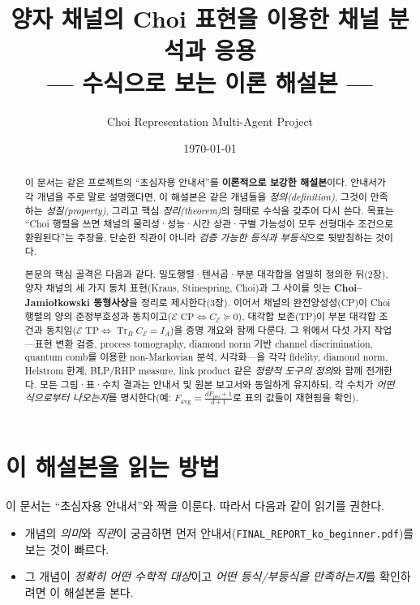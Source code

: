 \documentclass[11pt,a4paper]{article}
\title{\textbf{양자 채널의 Choi 표현을 이용한 채널 분석과 응용\\[4pt]
\large{--- 수식으로 보는 이론 해설본 ---}}}
\author{Choi Representation Multi-Agent Project}
\date{\today}
\newcommand{\E}{\mathcal{E}}
\newcommand{\Tr}{\operatorname{Tr}}
\theoremstyle{definition}
\theoremstyle{plain}
\theoremstyle{remark}
\begin{document}
\maketitle

\begin{abstract}
이 문서는 같은 프로젝트의 ``초심자용 안내서''를 \textbf{이론적으로 보강한 해설본}이다. 안내서가 각 개념을 주로 말로 설명했다면, 이 해설본은 같은 개념들을 \emph{정의(definition)}, 그것이 만족하는 \emph{성질(property)}, 그리고 핵심 \emph{정리(theorem)}의 형태로 수식을 갖추어 다시 쓴다. 목표는 ``Choi 행렬을 쓰면 채널의 물리성·성능·시간 상관·구별 가능성이 모두 선형대수 조건으로 환원된다''는 주장을, 단순한 직관이 아니라 \emph{검증 가능한 등식과 부등식}으로 뒷받침하는 것이다.

본문의 핵심 골격은 다음과 같다. 밀도행렬·텐서곱·부분 대각합을 엄밀히 정의한 뒤(2장), 양자 채널의 세 가지 동치 표현(Kraus, Stinespring, Choi)과 그 사이를 잇는 \textbf{Choi--Jamio{\l}kowski 동형사상}을 정리로 제시한다(3장). 이어서 채널의 완전양성성(CP)이 Choi 행렬의 양의 준정부호성과 동치이고($\E \text{ CP}\iff C_\E\succeq0$), 대각합 보존(TP)이 부분 대각합 조건과 동치임($\E\text{ TP}\iff\Tr_B C_\E=I_A$)을 증명 개요와 함께 다룬다. 그 위에서 다섯 가지 작업---표현 변환 검증, process tomography, diamond norm 기반 channel discrimination, quantum comb를 이용한 non-Markovian 분석, 시각화---을 각각 fidelity, diamond norm, Helstrom 한계, BLP/RHP measure, link product 같은 \emph{정량적 도구의 정의}와 함께 전개한다. 모든 그림·표·수치 결과는 안내서 및 원본 보고서와 동일하게 유지하되, 각 수치가 \emph{어떤 식으로부터 나오는지}를 명시한다(예: $F_{\mathrm{avg}}=\frac{dF_{\mathrm{pro}}+1}{d+1}$로 표의 값들이 재현됨을 확인).
\end{abstract}

\tableofcontents
\newpage

\section{이 해설본을 읽는 방법}

이 문서는 ``초심자용 안내서''와 짝을 이룬다. 따라서 다음과 같이 읽기를 권한다.

\begin{itemize}
  \item 개념의 \emph{의미}와 \emph{직관}이 궁금하면 먼저 안내서(\texttt{FINAL\_REPORT\_ko\_beginner.pdf})를 보는 것이 빠르다.
  \item 그 개념이 \emph{정확히 어떤 수학적 대상}이고 \emph{어떤 등식/부등식을 만족하는지}를 확인하려면 이 해설본을 본다.
\end{itemize}
\end{document}
